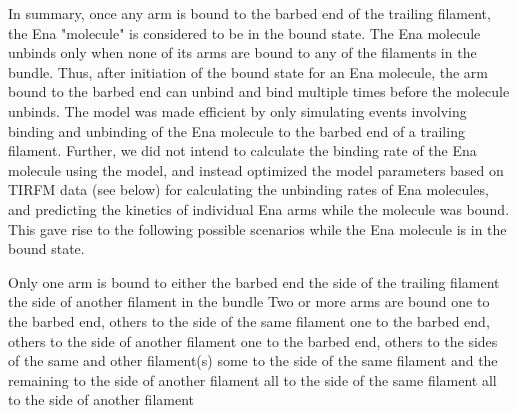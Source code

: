 In summary, once any arm is bound to the barbed end of the trailing filament, the Ena "molecule" is considered to be in the bound state. The Ena molecule unbinds only when none of its arms are bound to any of the filaments in the bundle. Thus, after initiation of the bound state for an Ena molecule, the arm bound to the barbed end can unbind and bind multiple times before the molecule unbinds.
The model was made efficient by only simulating events involving binding and unbinding of the Ena molecule to the barbed end of a trailing filament. Further, we did not intend to calculate the binding rate of the Ena molecule using the model, and instead optimized the model parameters based on TIRFM data (see below) for calculating the unbinding rates of Ena molecules, and predicting the kinetics of individual Ena arms while the molecule was bound. This gave rise to the following possible scenarios while the Ena molecule is in the bound state.
\begin{outline}[enumerate]
   \1 Only one arm is bound to either
      \2 the barbed end
      \2 the side of the trailing filament
      \2 the side of another filament in the bundle
   \1 Two or more arms are bound
      \2 one to the barbed end, others to the side of the same filament
      \2 one to the barbed end, others to the side of another filament
      \2 one to the barbed end, others to the sides of the same and other filament(s)
      \2 some to the side of the same filament and the remaining to the side of another filament
      \2 all to the side of the same filament
      \2 all to the side of another filament
\end{outline}


